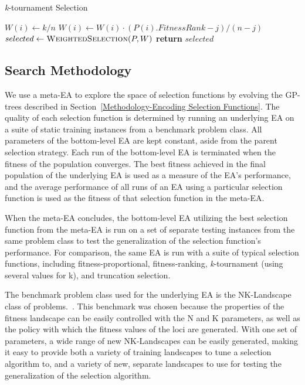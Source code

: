 \documentclass[sigconf]{acmart}
\begin{document}
\begin{algorithm}
\caption{\textit{k}-tournament Selection}
\label{alg:KTournamentSelection}
\begin{algorithmic}[1]
		\State $W(i) \leftarrow k/n$
			\State $W(i) \leftarrow W(i) \cdot (P(i).FitnessRank - j)/(n-j)$
		\EndFor
	\EndFor
	\State $selected \leftarrow \Call{WeightedSelection}{P, W}$	
	\State \textbf{return} $selected$
\EndProcedure
\end{algorithmic}
\end{algorithm}

\subsection{Search Methodology}
\label{Methodology-Search Methodology}

We use a meta-EA to explore the space of selection functions by evolving the GP-trees described in Section~\ref{Methodology-Encoding Selection Functions}. The quality of each selection function is determined by running an underlying EA on a suite of static training instances from a benchmark problem class. All parameters of the bottom-level EA are kept constant, aside from the parent selection strategy. Each run of the bottom-level EA is terminated when the fitness of the population converges. The best fitness achieved in the final population of the underlying EA is used as a measure of the EA's performance, and the average performance of all runs of an EA using a particular selection function is used as the fitness of that selection function in the meta-EA.

When the meta-EA concludes, the bottom-level EA utilizing the best selection function from the meta-EA is run on a set of separate testing instances from the same problem class to test the generalization of the selection function's performance. For comparison, the same EA is run with a suite of typical selection functions, including fitness-proportional, fitness-ranking, \textit{k}-tournament (using several values for k), and truncation selection.

The benchmark problem class used for the underlying EA is the NK-Landscape class of problems.~\cite{kaufmann1993origins}. This benchmark was chosen because the properties of the fitness landscape can be easily controlled with the N and K parameters, as well as the policy with which the fitness values of the loci are generated. With one set of parameters, a wide range of new NK-Landscapes can be easily generated, making it easy to provide both a variety of training landscapes to tune a selection algorithm to, and a variety of new, separate landscapes to use for testing the generalization of the selection algorithm. 
\end{document}
